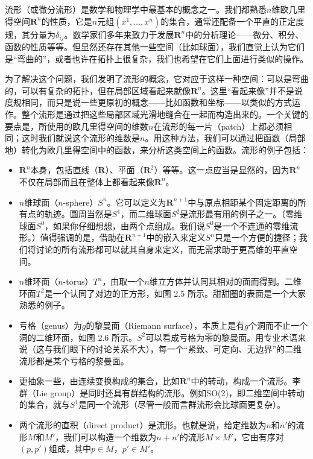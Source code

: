 流形（或微分流形）是数学和物理学中最基本的概念之一。我们都熟悉$n$维欧几里得空间$\mathbf{R}^n$的性质，它是$n$元组$(x^1,\ldots,x^n)$的集合，通常还配备一个平直的正定度规，其分量为$\delta_{ij}$。数学家们多年来致力于发展$\mathbf{R}^n$中的分析理论——微分、积分、函数的性质等等。但显然还存在其他一些空间（比如球面），我们直觉上认为它们是“弯曲的”，或者也许在拓扑上很复杂，我们也希望在它们上面进行类似的操作。

为了解决这个问题，我们发明了流形的概念，它对应于这样一种空间：可以是弯曲的，可以有复杂的拓扑，但在局部区域看起来就像$\mathbf{R}^n$。这里“看起来像”并不是说度规相同，而只是说一些更原初的概念——比如函数和坐标——以类似的方式运作。整个流形是通过把这些局部区域光滑地缝合在一起而构造出来的。一个关键的要点是，所使用的欧几里得空间的维数$n$在流形的每一片（patch）上都必须相同；这时我们就说这个流形的维数是$n$。用这种方法，我们可以通过把函数（局部地）转化为欧几里得空间中的函数，来分析这类空间上的函数。流形的例子包括：

\begin{itemize}
\item $\mathbf{R}^n$本身，包括直线（$\mathbf{R}$）、平面（$\mathbf{R}^2$）等等。这一点应当是显然的，因为$\mathbf{R}^n$不仅在局部而且在整体上都看起来像$\mathbf{R}^n$。
\item $n$维球面（$n$-sphere）$S^n$。它可以定义为$\mathbf{R}^{n+1}$中与原点相距某个固定距离的所有点的轨迹。圆周当然是$S^1$，而二维球面$S^2$是流形最有用的例子之一。（零维球面$S^0$，如果你仔细想想，由两个点组成。我们说$S^0$是一个不连通的零维流形。）值得强调的是，借助在$\mathbf{R}^{n+1}$中的嵌入来定义$S^n$只是一个方便的捷径；我们将讨论的所有流形都可以就其自身来定义，而无需求助于更高维的平直空间。
\item $n$维环面（$n$-torus）$T^n$，由取一个$n$维立方体并认同其相对的面而得到。二维环面$T^2$是一个认同了对边的正方形，如图 2.5 所示。甜甜圈的表面是一个大家熟悉的例子。
\item 亏格（genus）为$g$的黎曼面（Riemann surface），本质上是有$g$个洞而不止一个洞的二维环面，如图 2.6 所示。$S^2$可以看成亏格为零的黎曼面。用专业术语来说（这与我们眼下的讨论关系不大），每一个“紧致、可定向、无边界”的二维流形都是某个亏格的黎曼面。
\item 更抽象一些，由连续变换构成的集合，比如$\mathbf{R}^n$中的转动，构成一个流形。李群（Lie group）是同时还具有群结构的流形。例如SO(2)，即二维空间中转动的集合，就与$S^1$是同一个流形（尽管一般而言群流形会比球面更复杂）。
\item 两个流形的直积（direct product）是流形。也就是说，给定维数为$n$和$n'$的流形$M$和$M'$，我们可以构造一个维数为$n+n'$的流形$M\times M'$，它由有序对$(p,p')$组成，其中$p\in M$，$p'\in M'$。
\end{itemize}


